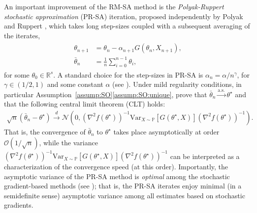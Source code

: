 \documentclass[11pt,a4paper]{article}
\theoremstyle{definition}
\newcommand{\mc}{\mathcal}
\begin{document}
An important improvement of the RM-SA method is the \emph{Polyak-Ruppert stochastic approximation} (PR-SA) iteration, proposed independently by Polyak \cite{polyak1990new, polyak1992acceleration} and Ruppert \cite{ruppert1988efficient}, which takes long step-sizes coupled with a subsequent averaging of the iterates,
\begin{align}
\label{eq:PR-SA}
\begin{split}
    \theta_{n+1} &= \theta_n - \alpha_{n+1} G(\theta_n, X_{n+1}),\\
    \bar{\theta}_n &= \frac{1}{n} \sum_{i=0}^{n-1} \theta_i,
\end{split}
\end{align}
for some $\theta_0 \in \mathbb R^s$. A standard choice for the step-sizes in PR-SA is $\alpha_n = \alpha/n^\gamma$, for $\gamma \in (1/2,1)$ and some constant $\alpha$ (see \cite[Assumption~3.4]{polyak1992acceleration}).
Under mild regularity conditions, in particular Assumption~\ref{assump:SO}\ref{assump:SO:unique}, \citet[Theorem~2]{polyak1992acceleration} prove that $\bar{\theta}_n \overset{\text{a.s.}}{\to} \theta^\star$ and that the following central limit theorem (CLT) holds:
\begin{align}
\label{eq:PR-SA:CLT}
    \sqrt{n}\left( \bar{\theta}_n - \theta^\star \right) \overset{d}{\to} \mathcal N \left(0, (\nabla^2  f(\theta^\star))^{-1} \text{Var}_{X \sim \mathbb P}\left[G(\theta^\star,X)\right] (\nabla^2  f(\theta^\star))^{-1}\right).
\end{align}
That is, the convergence of $\bar \theta_n$ to $\theta^\star$ takes place asymptotically at order $\mc O(1/\sqrt{n})$, while the variance $(\nabla^2  f(\theta^\star))^{-1} \text{Var}_{X \sim \mathbb P}\left[G(\theta^\star,X)\right] (\nabla^2  f(\theta^\star))^{-1}$ can be interpreted as a characterization of the convergence speed (at this order). Importantly, the asymptotic variance of the PR-SA method is \emph{optimal} among the stochastic gradient-based methods (see \cite[Chapter~8,~Section~4]{asmussen2007stochastic}); that is, the PR-SA iterates enjoy minimal (in a semidefinite sense) asymptotic variance among all estimates based on stochastic gradients.
\end{document}
